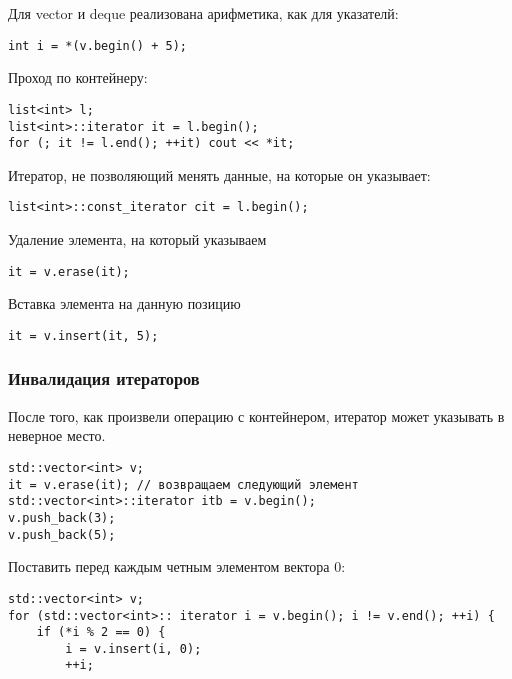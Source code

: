 Для vector и deque реализована арифметика, как для указателй:
\begin{verbatim}
int i = *(v.begin() + 5);
\end{verbatim}
Проход по контейнеру:
\begin{verbatim}
list<int> l;
list<int>::iterator it = l.begin();
for (; it != l.end(); ++it) cout << *it;
\end{verbatim}
Итератор, не позволяющий менять данные, на которые он указывает:
\begin{verbatim}
list<int>::const_iterator cit = l.begin();
\end{verbatim}
Удаление элемента, на который указываем
\begin{verbatim}
it = v.erase(it);
\end{verbatim}
Вставка элемента на данную позицию
\begin{verbatim}
it = v.insert(it, 5);
\end{verbatim}
\subsubsection{Инвалидация итераторов}
После того, как произвели операцию с контейнером, итератор может указывать в неверное место.
\begin{verbatim}
std::vector<int> v;
it = v.erase(it); // возвращаем следующий элемент
std::vector<int>::iterator itb = v.begin();
v.push_back(3);
v.push_back(5);
\end{verbatim}
Поставить перед каждым четным элементом вектора 0:
\begin{verbatim}
std::vector<int> v;
for (std::vector<int>:: iterator i = v.begin(); i != v.end(); ++i) {
    if (*i % 2 == 0) {
	    i = v.insert(i, 0);
		++i;
\end{verbatim}
